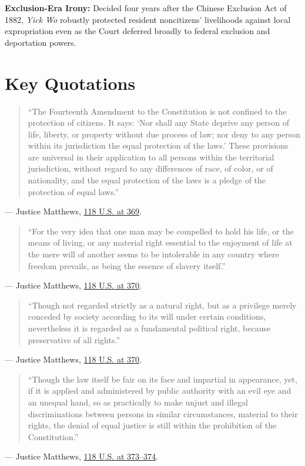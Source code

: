 \documentclass[12pt]{article}
\begin{document}
\textbf{Exclusion-Era Irony:} Decided four years after the Chinese Exclusion Act of 1882, \emph{Yick Wo} robustly protected resident noncitizens' livelihoods against local expropriation even as the Court deferred broadly to federal exclusion and deportation powers.

\section{Key Quotations}
\begin{quote}
``The Fourteenth Amendment to the Constitution is not confined to the protection of citizens. It says: `Nor shall any State deprive any person of life, liberty, or property without due process of law; nor deny to any person within its jurisdiction the equal protection of the laws.' These provisions are universal in their application to all persons within the territorial jurisdiction, without regard to any differences of race, of color, or of nationality, and the equal protection of the laws is a pledge of the protection of equal laws.''
\end{quote}
\noindent --- Justice Matthews, \href{https://supreme.justia.com/cases/federal/us/118/356/}{118 U.S. at 369}.

\begin{quote}
``For the very idea that one man may be compelled to hold his life, or the means of living, or any material right essential to the enjoyment of life at the mere will of another seems to be intolerable in any country where freedom prevails, as being the essence of slavery itself.''
\end{quote}
\noindent --- Justice Matthews, \href{https://supreme.justia.com/cases/federal/us/118/356/}{118 U.S. at 370}.

\begin{quote}
``Though not regarded strictly as a natural right, but as a privilege merely conceded by society according to its will under certain conditions, nevertheless it is regarded as a fundamental political right, because preservative of all rights.''
\end{quote}
\noindent --- Justice Matthews, \href{https://supreme.justia.com/cases/federal/us/118/356/}{118 U.S. at 370}.

\begin{quote}
``Though the law itself be fair on its face and impartial in appearance, yet, if it is applied and administered by public authority with an evil eye and an unequal hand, so as practically to make unjust and illegal discriminations between persons in similar circumstances, material to their rights, the denial of equal justice is still within the prohibition of the Constitution.''
\end{quote}
\noindent --- Justice Matthews, \href{https://supreme.justia.com/cases/federal/us/118/356/}{118 U.S. at 373--374}.
\end{document}
